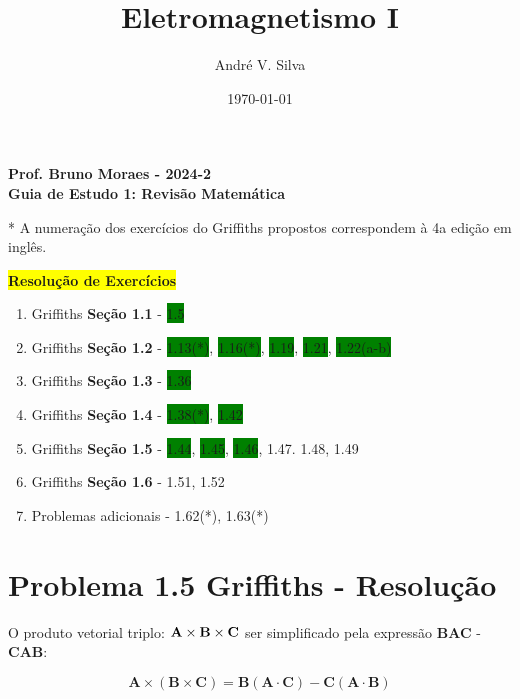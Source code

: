 \documentclass[a4paper,12pt]{article}
\title{ \textbf{\large Eletromagnetismo I }}
\author{Andr\'e V. Silva}
\date{\today}
\begin{document}
\maketitle

\begin{center}
    \textbf{Prof. Bruno Moraes - 2024-2}\\
    \textbf{Guia de Estudo 1: Revisão Matemática}
    \end{center}
    
    * A numeração dos exercícios do Griffiths propostos correspondem à 4a edição em inglês.\\
    
    \begin{center}
    \colorbox{yellow}{\textbf{Resolu\c{c}\~ao de Exerc\'icios}}
    \end{center}
    
    \begin{enumerate}
    \item Griffiths \textbf{Seção 1.1} - \colorbox{green}{1.5} 
    \item Griffiths \textbf{Seção 1.2} - \colorbox{green}{1.13(*)}, \colorbox{green}{1.16(*)}, \colorbox{green}{1.19}, \colorbox{green}{1.21}, \colorbox{green}{1.22(a-b)}
    \item Griffiths \textbf{Seção 1.3} - \colorbox{green}{1.36}
    \item Griffiths \textbf{Seção 1.4} - \colorbox{green}{1.38(*)}, \colorbox{green}{1.42}
    \item Griffiths \textbf{Seção 1.5} - \colorbox{green}{1.44}, \colorbox{green}{1.45}, \colorbox{green}{1.46}, 1.47. 1.48, 1.49
    \item Griffiths \textbf{Seção 1.6} - 1.51, 1.52
    \item Problemas adicionais - 1.62(*), 1.63(*)
    \end{enumerate}

\section*{Problema 1.5 Griffiths - Resolu\c{c}\~ao}

O produto vetorial triplo: $\textrm{\textbf{A}}\times\textrm{\textbf{B}}\times\textrm{\textbf{C}}$
ser simplificado pela express\~ao \textbf{BAC} - \textbf{CAB}:

\begin{equation}
    \textbf{A}\times(\textbf{B}\times\textbf{C}) =  \textbf{B}(\textbf{A}\cdot\textbf{C}) - \textbf{C}(\textbf{A}\cdot\textbf{B})
\end{equation}
\end{document}
